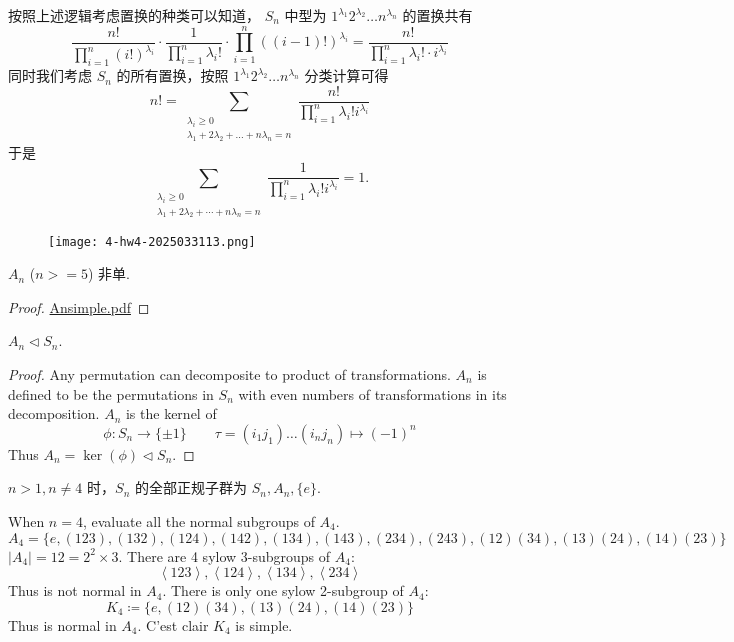 按照上述逻辑考虑置换的种类可以知道， $S_n$ 中型为 $1^{\lambda_1}2^{\lambda_2}\dots n^{\lambda _n}$ 的置换共有
\[
\frac{n!}{\prod_{i=1}^{n} (i!)^{\lambda _i}}\cdot\frac{1}{\prod_{i=1}^{n} \lambda _i!}\cdot \prod_{i=1}^{n} ((i-1)!)^{\lambda _i}=\frac{n!}{\prod_{i=1}^{n} \lambda _i!\cdot i^{\lambda _i}}
\]
同时我们考虑 $S_n$ 的所有置换，按照 $1^{\lambda_1}2^{\lambda_2}\dots n^{\lambda _n}$ 分类计算可得
\[
n!=\sum_{\substack{\lambda _i\geq 0
\\
\lambda_1+2\lambda_2+\dots+n\lambda _n=n}}\frac{n!}{\prod_{i=1}^{n} \lambda _i!i^{\lambda _i}}
\]
于是
\[
\sum_{\substack{\lambda_i \geqslant 0 \\ \lambda_1+2 \lambda_2+\cdots+n \lambda_n=n}} \frac{1}{\prod_{i=1}^n \lambda_{i}!i^{\lambda_i}}=1 .
\]
\begin{figure}[H]
\centering
\texttt{[image: 4-hw4-2025033113.png]}
\label{}
\end{figure}

\begin{lemma}
$A_n$ ($n>=5$) 非单.\label{c6e538}
\end{lemma}

\begin{proof}
\href{https://kconrad.math.uconn.edu/blurbs/grouptheory/Ansimple.pdf}{Ansimple.pdf}
\end{proof}

\begin{lemma}
$A_n\lhd S_n$.
\end{lemma}
\begin{proof}
Any permutation can decomposite to product of transformations. $A_n$ is defined to be the permutations in $S_n$ with even numbers of transformations in its decomposition. $A_n$ is the kernel of
\[
\phi:S_n\to \{ \pm1 \}\qquad \tau=(i_1 j_1)\dots(i_n j_n)\mapsto(-1)^{n}
\]
Thus $A_n=\ker (\phi)\lhd S_n$.
\end{proof}

$n>1,n\neq4$ 时，$S_n$ 的全部正规子群为 $S_n,A_n,\{ e \}$.

When $n=4$, evaluate all the normal subgroups of $A_4$.
\[
A_4=\{ e,(123),(132),(124),(142),(134),(143),(234),(243),(12)(34),(13)(24),(14)(23) \}
\]
$\lvert A_4 \rvert=12=2^{2}\times3$. There are 4 sylow 3-subgroups of $A_4$:
\[
\left< 123 \right> ,\left< 124 \right> ,\left< 134 \right> ,\left< 234 \right>
\]
Thus is not normal in $A_4$. There is only one sylow 2-subgroup of $A_4$:
\[
K_4\coloneqq \{ e, (12)(34),(13)(24),(14)(23)\}
\]
Thus is normal in $A_4$. C'est clair $K_4$ is simple.

